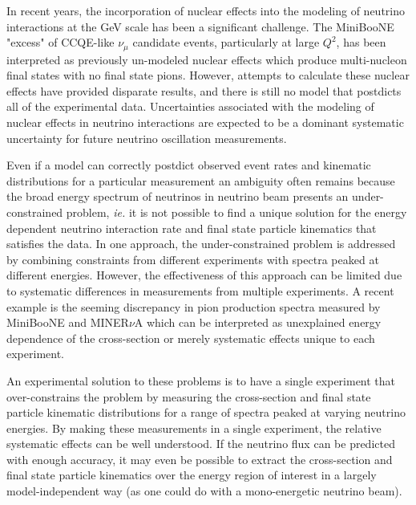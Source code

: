 In recent years, the incorporation of nuclear effects into the modeling of
neutrino interactions at the GeV scale has been a significant challenge.  The MiniBooNE 
"excess" of CCQE-like $\nu_{\mu}$ candidate events, particularly at large $Q^{2}$, 
has been interpreted as previously un-modeled nuclear effects which produce multi-nucleon final states with
no final state pions.  However, attempts to calculate these nuclear effects have provided disparate results, and there
is still no model that postdicts all of the experimental data.  Uncertainties associated with the
modeling of nuclear effects in neutrino interactions are expected to be a dominant systematic uncertainty
for future neutrino oscillation measurements.

Even if a model can correctly postdict observed event rates and kinematic distributions for a particular 
measurement an ambiguity often remains because the broad energy spectrum of neutrinos in neutrino beam presents
an under-constrained problem, {\it ie.} it is not possible to find a unique solution for the energy dependent 
neutrino interaction rate and final state particle kinematics that satisfies the data.  In one approach, the
under-constrained problem is addressed by combining constraints from different experiments with spectra peaked
at different energies.  However, the effectiveness of this approach can be limited due to systematic differences in 
measurements from multiple experiments.  A recent example is the seeming discrepancy in pion production spectra measured
by MiniBooNE and MINER$\nu$A which can be interpreted as unexplained energy dependence of the cross-section or merely
systematic effects unique to each experiment.

An experimental solution to these problems is to have a single 
experiment that over-constrains the problem by measuring the cross-section and final state particle kinematic distributions
for a range of spectra peaked at varying neutrino energies.  By making these measurements in a single experiment, the
relative systematic effects can be well understood.  If the neutrino flux can be predicted with enough accuracy, it 
may even be possible to extract the cross-section and final state particle kinematics over the energy region of interest
in a largely model-independent way (as one could do with a mono-energetic neutrino beam).

